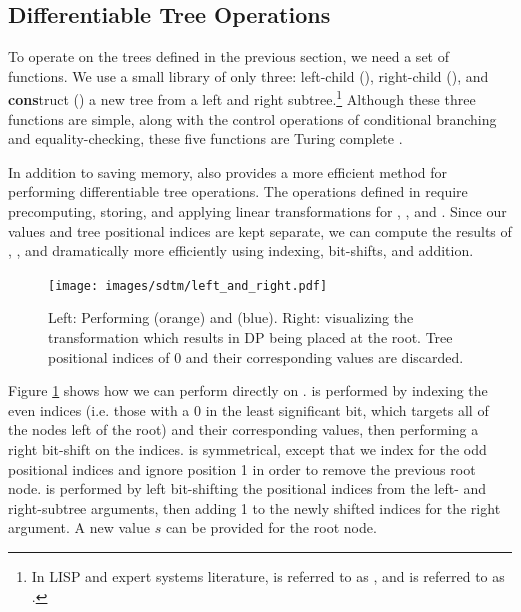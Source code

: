 \subsection{Differentiable Tree Operations} \label{sec:sdtm-diff-tree-ops}

To operate on the trees defined in the previous section, we need a set of functions. We use a small library of only three: left-child (\leftcommand), right-child (\rightcommand), and \textbf{cons}truct (\cons) a new tree from a left and right subtree.\footnote{In LISP and expert systems literature, \leftcommand is referred to as \car, and \rightcommand is referred to as \cdr.} Although these three functions are simple, along with the control operations of conditional branching and equality-checking, these five functions are Turing complete \citep{mccarthy1960recursive}.

In addition to saving memory, \abvrepname also provides a more efficient method for performing differentiable tree operations. The operations defined in \citet{Soulos_2023_DifferentiableTreeOperations} require precomputing, storing, and applying linear transformations for \leftcommand, \rightcommand, and \cons. Since our values and tree positional indices are kept separate, we can compute the results of \leftcommand, \rightcommand, and \cons dramatically more efficiently using indexing, bit-shifts, and addition.

\begin{figure}
    \centering
    \texttt{[image: images/sdtm/left\_and\_right.pdf]}
    \caption{Left: Performing \leftcommand (orange) and \rightcommand (blue). Right: visualizing the \leftcommand transformation which results in DP being placed at the root. Tree positional indices of $0$ and their corresponding values are discarded.}
    \label{fig:sparse-operations}
\end{figure}

Figure \ref{fig:sparse-operations} shows how we can perform \leftcommand directly on \abvrepname. \leftcommand is performed by indexing the even indices (i.e. those with a 0 in the least significant bit, which targets all of the nodes left of the root) and their corresponding values, then performing a right bit-shift on the indices. \rightcommand is symmetrical, except that we index for the odd positional indices and ignore position 1 in order to remove the previous root node. \cons is performed by left bit-shifting the positional indices from the left- and right-subtree arguments, then adding 1 to the newly shifted indices for the right argument. A new value $s$ can be provided for the root node.



